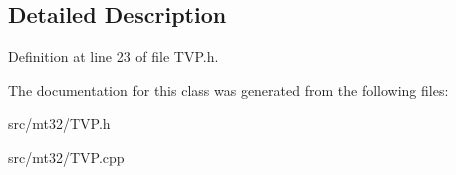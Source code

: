 \subsection{Detailed Description}


Definition at line 23 of file T\-V\-P.\-h.



The documentation for this class was generated from the following files\-:\begin{DoxyCompactItemize}
\item 
src/mt32/T\-V\-P.\-h\item 
src/mt32/T\-V\-P.\-cpp\end{DoxyCompactItemize}
